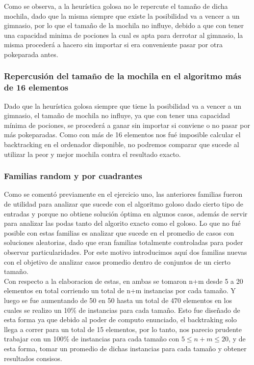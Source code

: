 Como se observa, a la heurística golosa no le repercute el tamaño de dicha mochila, dado que la misma siempre que existe la posibilidad va a vencer a un gimnasio, por lo que el tamaño de la mochila no influye, debido a que con tener una capacidad minima de pociones la cual es apta para derrotar al gimnasio, la misma proceder\'a a hacero sin importar si era conveniente pasar por otra pokeparada antes.

\subsubsection*{Repercusi\'on del tamaño de la mochila en el algoritmo más de 16 elementos}

Dado que la heur\'istica golosa siempre que tiene la posibilidad va a vencer a un gimnasio, el tamaño de mochila no influye, ya que con tener una capacidad m\'inima de pociones, se proceder\'a a ganar sin importar si conviene o no pasar por más pokeparadas. Como con más de 16 elementos nos fué imposible calcular el backtracking en el ordenador disponible, no podremos comparar que sucede al utilizar la peor y mejor mochila contra el resultado exacto.

\subsubsection*{Familias random y por cuadrantes}

Como se comentó previamente en el ejercicio uno, las anteriores familias fueron de utilidad para analizar que sucede con el algoritmo goloso dado cierto tipo de entradas y porque no obtiene solución óptima en algunos casos, además de servir para analizar las podas tanto del algorito exacto como el goloso. Lo que no fué posible con estas familias es analizar que sucede en el promedio de casos con soluciones aleatorias, dado que eran familias totalmente controladas para poder observar particularidades. Por este motivo introducimos aquí dos familias nuevas con el objetivo de analizar casos promedio dentro de conjuntos de un cierto tamaño.\\
Con respecto a la elaboracion de estas, en ambas se tomaron n+m desde 5 a 20 elementos en total corriendo un total de n+m instancias por cada tamaño. Y luego se fue aumentando de 50 en 50 hasta un total de 470 elementos en los cuales se realizo un 10$\%$ de instancias para cada tamaño. Esto fue diseñado de esta forma ya que debido al poder de computo enunciado, el backtraking solo llega a correr para un total de 15 elementos, por lo tanto, nos parecio prudente trabajar con un 100$\%$ de instancias para cada tamaño con $5 \leq n + m\leq 20$, y de esta forma, tomar un promedio de dichas instancias para cada tamaño y obtener resultados consisos.

